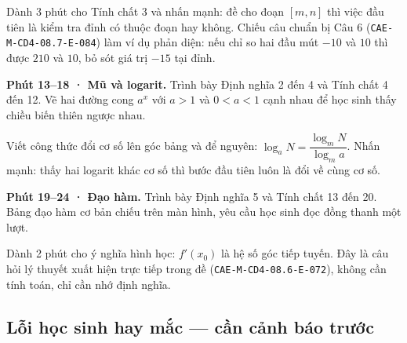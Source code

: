 \documentclass[11pt, a4paper]{article}
\begin{document}
Dành 3 phút cho Tính chất 3 và nhấn mạnh: đề cho đoạn $[m, n]$ thì việc đầu tiên là kiểm tra đỉnh có thuộc đoạn hay không. Chiếu câu chuẩn bị Câu 6 (\texttt{CAE-M-CD4-08.7-E-084}) làm ví dụ phản diện: nếu chỉ so hai đầu mút $-10$ và $10$ thì được $210$ và $10$, bỏ sót giá trị $-15$ tại đỉnh.

\textbf{Phút 13–18 · Mũ và logarit.} Trình bày Định nghĩa 2 đến 4 và Tính chất 4 đến 12. Vẽ hai đường cong $a^x$ với $a > 1$ và $0 < a < 1$ cạnh nhau để học sinh thấy chiều biến thiên ngược nhau.

Viết công thức đổi cơ số lên góc bảng và để nguyên: $\log_a N = \dfrac{\log_m N}{\log_m a}$. Nhấn mạnh: thấy hai logarit khác cơ số thì bước đầu tiên luôn là đổi về cùng cơ số.

\textbf{Phút 19–24 · Đạo hàm.} Trình bày Định nghĩa 5 và Tính chất 13 đến 20. Bảng đạo hàm cơ bản chiếu trên màn hình, yêu cầu học sinh đọc đồng thanh một lượt.

Dành 2 phút cho ý nghĩa hình học: $f'(x_0)$ là hệ số góc tiếp tuyến. Đây là câu hỏi lý thuyết xuất hiện trực tiếp trong đề (\texttt{CAE-M-CD4-08.6-E-072}), không cần tính toán, chỉ cần nhớ định nghĩa.

\subsection{Lỗi học sinh hay mắc — cần cảnh báo trước}

\end{document}
